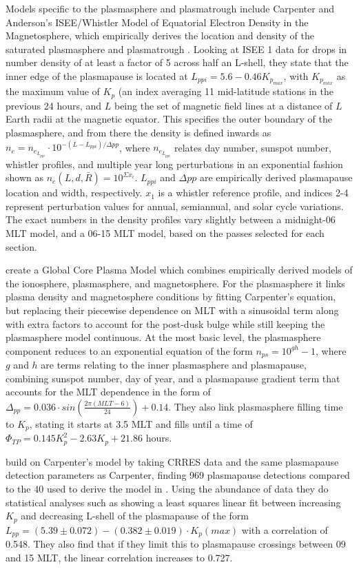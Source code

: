 Models specific to the plasmasphere and plasmatrough include Carpenter and Anderson's ISEE/Whistler Model of Equatorial Electron Density in the Magnetosphere, which empirically derives the location and density of the saturated plasmasphere and plasmatrough \citep{Carpenter1992ISEEModel}. Looking at ISEE 1 data for drops in number density of at least a factor of 5 across half an L-shell, they state that the inner edge of the plasmapause is located at $L_{ppi}=5.6-0.46K_{p_{max}}$, with $K_{p_{max}}$ as the maximum value of $K_p$ (an index averaging 11 mid-latitude stations in the previous 24 hours, and $L$ being the set of magnetic field lines at a distance of $L$ Earth radii at the magnetic equator. This specifies the outer boundary of the plasmasphere, and from there the density is defined inwards as $n_e=n_{e_{L_{ppi}}}\cdot 10^{-(L-L_{ppi})/\Delta pp}$, where $n_{e_{L_{ppi}}}$ relates day number, sunspot number, whistler profiles, and multiple year long perturbations in an exponential fashion shown as $n_e(L,d,\bar{R})=10^{\Sigma x_i}$. $L_{ppi}$ and $\Delta pp$ are empirically derived plasmapause location and width, respectively. $x_1$ is a whistler reference profile, and indices 2-4 represent perturbation values for annual, semiannual, and solar cycle variations. The exact numbers in the density profiles vary slightly between a midnight-06 MLT model, and a 06-15 MLT model, based on the passes selected for each section.

\cite{Gallagher2000GlobalCore} create a Global Core Plasma Model which combines empirically derived models of the ionosphere, plasmasphere, and magnetosphere. For the plasmasphere it links plasma density and magnetosphere conditions by fitting Carpenter's equation, but replacing their piecewise dependence on MLT with a sinusoidal term along with extra factors to account for the post-dusk bulge while still keeping the plasmasphere model continuous. At the most basic level, the plasmasphere component reduces to an exponential equation of the form $n_{ps}=10^{gh}-1$, where $g$ and $h$ are terms relating to the inner plasmasphere and plasmapause, combining sunspot number, day of year, and a plasmapause gradient term that accounts for the MLT dependence in the form of $\Delta_{pp}=0.036\cdot sin(\frac{2\pi (MLT-6)}{24})+0.14$. They also link plasmasphere filling time to $K_p$, stating it starts at 3.5 MLT and fills until a time of $\Phi_{TP}=0.145K_p^2-2.63K_p+21.86$ hours\cite{Gallagher1995AzimuthalVariation}.

\cite{Moldwin2002ModelPlasmapause} build on Carpenter's model by taking CRRES data and the same plasmapause detection parameters as Carpenter, finding 969 plasmapause detections compared to the 40 used to derive the model in \citep{Carpenter1992ISEEModel}. Using the abundance of data they do statistical analyses such as showing a least squares linear fit between increasing $K_p$ and decreasing L-shell of the plasmapause of the form $L_{pp}=(5.39\pm 0.072)-(0.382\pm 0.019)\cdot K_p(max)$ with a correlation of 0.548. They also find that if they limit this to plasmapause crossings between 09 and 15 MLT, the linear correlation increases to 0.727.

